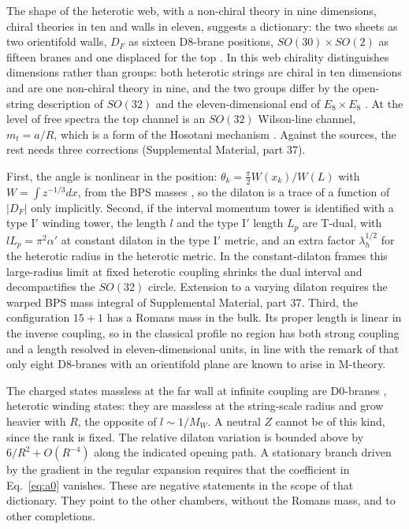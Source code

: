 \documentclass[aps,prd,reprint,onecolumn,nofootinbib,amsmath,amssymb,floatfix]{revtex4-2}
\theoremstyle{plain}
\newcommand{\supp}[1]{Supplemental Material, part #1}
\begin{document}
The shape of the heterotic web, with a non-chiral theory in nine dimensions, chiral theories in ten and walls in eleven, suggests a dictionary: the two sheets as two orientifold walls, $D_F$ as sixteen D8-brane positions, $SO(30)\times SO(2)$ as fifteen branes and one displaced for the top \cite{towerlesspaper,PW1996}. In this web chirality distinguishes dimensions rather than groups: both heterotic strings are chiral in ten dimensions and are one non-chiral theory in nine, and the two groups differ by the open-string description of $SO(32)$ \cite{PW1996} and the eleven-dimensional end of $E_8\times E_8$ \cite{HW1996}. At the level of free spectra the top channel is an $SO(32)$ Wilson-line channel, $m_t=a/R$, which is a form of the Hosotani mechanism \cite{Hosotani1983}. Against the sources, the rest needs three corrections (\supp{37}).

First, the angle is nonlinear in the position: $\theta_k=\tfrac\pi2W(x_k)/W(L)$ with $W=\int z^{-1/3}dx$, from the BPS masses \cite{PW1996}, so the dilaton is a trace of a function of $|D_F|$ only implicitly. Second, if the interval momentum tower is identified with a type I$'$ winding tower, the length $l$ and the type I$'$ length $L_p$ are T-dual, with $lL_p=\pi^2\alpha'$ at constant dilaton in the type I$'$ metric, and an extra factor $\lambda_h^{1/2}$ for the heterotic radius in the heterotic metric. In the constant-dilaton frames this large-radius limit at fixed heterotic coupling shrinks the dual interval and decompactifies the $SO(32)$ circle. Extension to a varying dilaton requires the warped BPS mass integral of \supp{37}. Third, the configuration $15+1$ has a Romans mass in the bulk. Its proper length is linear in the inverse coupling, so in the classical profile no region has both strong coupling and a length resolved in eleven-dimensional units, in line with the remark of \cite{BGL1998} that only eight D8-branes with an orientifold plane are known to arise in M-theory.

The charged states massless at the far wall at infinite coupling are D0-branes \cite{BGL1998}, heterotic winding states: they are massless at the string-scale radius and grow heavier with $R$, the opposite of $l\sim1/M_W$. A neutral $Z$ cannot be of this kind, since the rank is fixed. The relative dilaton variation is bounded above by $6/R^2+O(R^{-4})$ along the indicated opening path. A stationary branch driven by the gradient in the regular expansion requires that the coefficient in Eq.~\eqref{eq:a0} vanishes. These are negative statements in the scope of that dictionary. They point to the other chambers, without the Romans mass, and to other completions.
\end{document}
